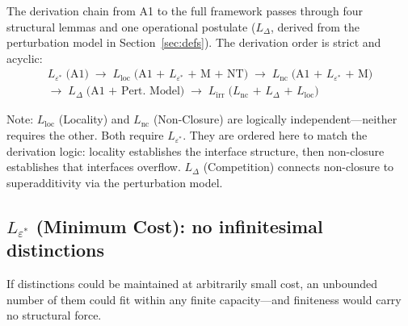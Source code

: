 \documentclass[11pt]{article}
\begin{document}
The derivation chain from A1 to the full framework passes through four structural lemmas and one operational postulate ($L_\Delta$, derived from the perturbation model in Section~\ref{sec:defs}).  The derivation order is strict and acyclic:
\begin{multline*}
L_{\varepsilon^*}\;\text{(A1)} \;\to\; L_{\mathrm{loc}}\;\text{(A1 + $L_{\varepsilon^*}$ + M + NT)} \;\to\; L_{\mathrm{nc}}\;\text{(A1 + $L_{\varepsilon^*}$ + M)} \\
\to\; L_{\Delta}\;\text{(A1 + Pert.\ Model)} \;\to\; L_{\mathrm{irr}}\;\text{($L_{\mathrm{nc}}$ + $L_\Delta$ + $L_{\mathrm{loc}}$)}
\end{multline*}

Note: $L_{\mathrm{loc}}$ (Locality) and $L_{\mathrm{nc}}$ (Non-Closure) are logically independent---neither requires the other.  Both require $L_{\varepsilon^*}$.  They are ordered here to match the derivation logic: locality establishes the interface structure, then non-closure establishes that interfaces overflow.  $L_\Delta$ (Competition) connects non-closure to superadditivity via the perturbation model.


\subsection{\texorpdfstring{$L_{\varepsilon^*}$}{L epsilon*} (Minimum Cost): no infinitesimal distinctions}
\label{sec:eps_star}

If distinctions could be maintained at arbitrarily small cost, an unbounded number of them could fit within any finite capacity---and finiteness would carry no structural force.
\end{document}
